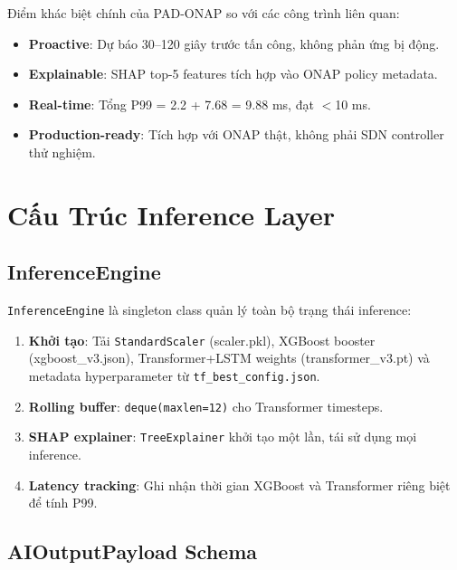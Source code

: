 \documentclass[12pt,a4paper]{article}
\begin{document}
Điểm khác biệt chính của PAD-ONAP so với các công trình liên quan:
\begin{itemize}[leftmargin=2em]
\item \textbf{Proactive}: Dự báo 30--120 giây trước tấn công, không phản ứng bị động.
\item \textbf{Explainable}: SHAP top-5 features tích hợp vào ONAP policy metadata.
\item \textbf{Real-time}: Tổng P99 = 2.2 + 7.68 = 9.88 ms, đạt $<$10 ms.
\item \textbf{Production-ready}: Tích hợp với ONAP thật, không phải SDN controller thử nghiệm.
\end{itemize}

\section{Cấu Trúc Inference Layer}

\subsection{InferenceEngine}

\texttt{InferenceEngine} là singleton class quản lý toàn bộ trạng thái inference:

\begin{enumerate}[leftmargin=2em]
\item \textbf{Khởi tạo}: Tải \texttt{StandardScaler} (scaler.pkl), XGBoost booster (xgboost\_v3.json), Transformer+LSTM weights (transformer\_v3.pt) và metadata hyperparameter từ \texttt{tf\_best\_config.json}.
\item \textbf{Rolling buffer}: \texttt{deque(maxlen=12)} cho Transformer timesteps.
\item \textbf{SHAP explainer}: \texttt{TreeExplainer} khởi tạo một lần, tái sử dụng mọi inference.
\item \textbf{Latency tracking}: Ghi nhận thời gian XGBoost và Transformer riêng biệt để tính P99.
\end{enumerate}

\subsection{AIOutputPayload Schema}
\end{document}
